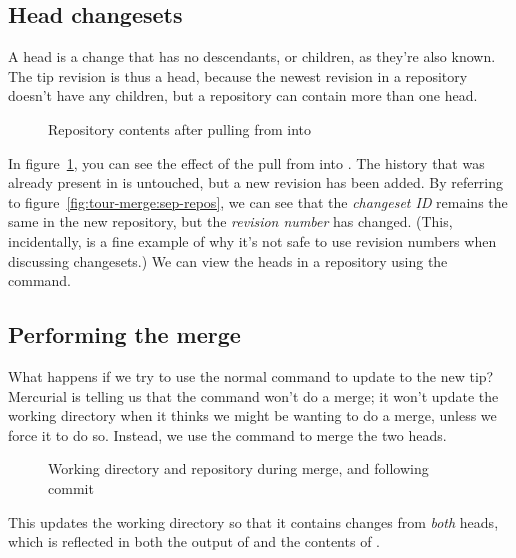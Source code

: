 \subsection{Head changesets}

A head is a change that has no descendants, or children, as they're
also known.  The tip revision is thus a head, because the newest
revision in a repository doesn't have any children, but a repository
can contain more than one head.

\begin{figure}[ht]
  \centering
  \caption{Repository contents after pulling from  into
    }
  \label{fig:tour-merge:pull}
\end{figure}

In figure~\ref{fig:tour-merge:pull}, you can see the effect of the
pull from  into .  The history
that was already present in  is untouched, but a
new revision has been added.  By referring to
figure~\ref{fig:tour-merge:sep-repos}, we can see that the
\emph{changeset ID} remains the same in the new repository, but the
\emph{revision number} has changed.  (This, incidentally, is a fine
example of why it's not safe to use revision numbers when discussing
changesets.)  We can view the heads in a repository using the
 command.

\subsection{Performing the merge}

What happens if we try to use the normal  command to
update to the new tip?
Mercurial is telling us that the  command won't do a
merge; it won't update the working directory when it thinks we might
be wanting to do a merge, unless we force it to do so.  Instead, we
use the  command to merge the two heads.

\begin{figure}[ht]
  \centering
  \caption{Working directory and repository during merge, and
    following commit}
  \label{fig:tour-merge:merge}
\end{figure}

This updates the working directory so that it contains changes from
\emph{both} heads, which is reflected in both the output of
 and the contents of .


